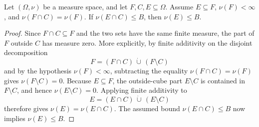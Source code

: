 \begin{helper}
Let \((\Omega,\nu)\) be a measure space, and let \(F,C,E\subseteq\Omega\).
Assume \(E\subseteq F\), \(\nu(F)<\infty\), and \(\nu(F\cap C)=\nu(F)\).
If \(\nu(E\cap C)\le B\), then \(\nu(E)\le B\).
\end{helper}
\begin{proof}
Since \(F\cap C\subseteq F\) and the two sets have the same finite measure,
the part of \(F\) outside \(C\) has measure zero.  More explicitly, by finite
additivity on the disjoint decomposition
\[
F=(F\cap C)\,\dot\cup\, (F\setminus C)
\]
and by the hypothesis \(\nu(F)<\infty\), subtracting the equality
\(\nu(F\cap C)=\nu(F)\) gives \(\nu(F\setminus C)=0\).  Because
\(E\subseteq F\), the outside-cube part \(E\setminus C\) is contained in
\(F\setminus C\), and hence \(\nu(E\setminus C)=0\).  Applying finite
additivity to
\[
E=(E\cap C)\,\dot\cup\, (E\setminus C)
\]
therefore gives \(\nu(E)=\nu(E\cap C)\).  The assumed bound
\(\nu(E\cap C)\le B\) now implies \(\nu(E)\le B\).
\end{proof}
